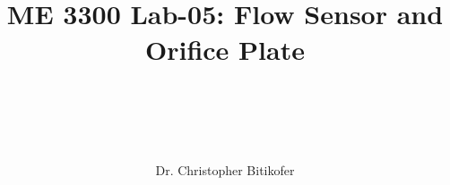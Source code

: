 
\title{
\begin{center}
\HRule \\[0.4cm]
{\Huge \bfseries ME 3300 Lab-05: 
Flow Sensor and Orifice Plate \\[0.5cm] 
}\\[0.4cm] %
\HRule \\[1.5cm]
\end{center}
}
\author{\Large Dr. Christopher Bitikofer \\ \\ \\[.1cm]} %
\date{} %

\maketitle
\tableofcontents